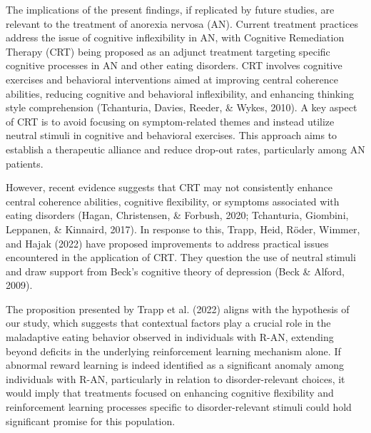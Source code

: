 \documentclass[
  man,floatsintext]{apa6}
\begin{document}
The implications of the present findings, if replicated by future studies, are relevant to the treatment of anorexia nervosa (AN). Current treatment practices address the issue of cognitive inflexibility in AN, with Cognitive Remediation Therapy (CRT) being proposed as an adjunct treatment targeting specific cognitive processes in AN and other eating disorders. CRT involves cognitive exercises and behavioral interventions aimed at improving central coherence abilities, reducing cognitive and behavioral inflexibility, and enhancing thinking style comprehension (Tchanturia, Davies, Reeder, \& Wykes, 2010). A key aspect of CRT is to avoid focusing on symptom-related themes and instead utilize neutral stimuli in cognitive and behavioral exercises. This approach aims to establish a therapeutic alliance and reduce drop-out rates, particularly among AN patients.

However, recent evidence suggests that CRT may not consistently enhance central coherence abilities, cognitive flexibility, or symptoms associated with eating disorders (Hagan, Christensen, \& Forbush, 2020; Tchanturia, Giombini, Leppanen, \& Kinnaird, 2017). In response to this, Trapp, Heid, Röder, Wimmer, and Hajak (2022) have proposed improvements to address practical issues encountered in the application of CRT. They question the use of neutral stimuli and draw support from Beck's cognitive theory of depression (Beck \& Alford, 2009).

The proposition presented by Trapp et al. (2022) aligns with the hypothesis of our study, which suggests that contextual factors play a crucial role in the maladaptive eating behavior observed in individuals with R-AN, extending beyond deficits in the underlying reinforcement learning mechanism alone. If abnormal reward learning is indeed identified as a significant anomaly among individuals with R-AN, particularly in relation to disorder-relevant choices, it would imply that treatments focused on enhancing cognitive flexibility and reinforcement learning processes specific to disorder-relevant stimuli could hold significant promise for this population.
\end{document}
